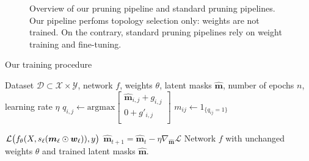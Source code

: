 \begin{figure}[htbp]
  \centering
  \vspace{0.10\textwidth}
  \caption{Overview of our pruning pipeline and standard pruning pipelines.
    Our pipeline perfoms topology selection only: weights are not trained.
    On the contrary, standard pruning pipelines rely on weight training and fine-tuning.}
\end{figure}


\begin{algorithm}
  \caption{Our training procedure}
  \label{alg:chap2:ASLP}
  \begin{algorithmic}
    \REQUIRE Dataset $\mathcal{D} \subset \mathcal{X} \times \mathcal{Y}$, network $f$,
    weights $\theta$, latent masks $\bm{\hat{m}}$, number of epochs $n$, learning rate $\eta$
    \STATE
    $q_{i,j} \gets \text{argmax}
      \begin{bmatrix}
        \bm{\hat{m}}_{i,j} + g_{i,j} \\
        0 + g'_{i,j}                 \\
      \end{bmatrix}$ 
    \STATE $m_{ij} \gets 1_{\{q_{ij}=1\}}$

    \STATE ${\cal L}\big(f_\theta(X,
        s_\ell (\bm{m}_\ell \odot \bm{w}_\ell)),y \big)$
    \STATE $\bm{\hat{m}}_{t+1} = \bm{\hat{m}}_t - \eta \nabla_{\bm{\hat{m}}} \mathcal{L}$ 
    \ENDFOR
    \ENDFOR
    \RETURN Network $f$ with unchanged weights $\theta$ and trained latent masks $\bm{\hat{m}}$.
  \end{algorithmic}
\end{algorithm}


